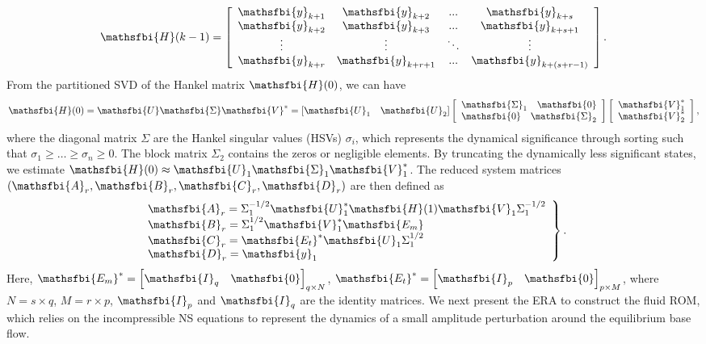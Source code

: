 \documentclass{jfm}
\begin{document}
\begin{equation}
\mathsfbi{H}(k-1) = 
\left[ {\begin{array}{*{20}c}
    \mathsfbi{y}_{k+1}&     \mathsfbi{y}_{k+2}& ...& \mathsfbi{y}_{k+s}        \\    
    \mathsfbi{y}_{k+2}& \mathsfbi{y}_{k+3}& ...& \mathsfbi{y}_{k+s+1}    \\
    \vdots& \vdots& \ddots& \vdots        \\
    \mathsfbi{y}_{k+r}& \mathsfbi{y}_{k+r+1}& ...&\mathsfbi{y}_{k+(s+r-1)}
 \end{array} } \right].
\label{eq:Hankel}
\end{equation}  
From the partitioned SVD of the Hankel matrix $\mathsfbi{H}(0)$, 
we can have
\begin{equation}
\mathsfbi{H}(0) = \mathsfbi{U}\mathsfbi{\Sigma}\mathsfbi{V}^*=
\left[\mathsfbi{U}_1 \quad \mathsfbi{U}_2\right]
\left[{\begin{array}{*{20}c}
   \mathsfbi{\Sigma}_1 \quad \mathsfbi{0} \\
   \mathsfbi{0} \quad \mathsfbi{\Sigma}_2
 \end{array} }
\right]
\left[{\begin{array}{*{20}c}
  \mathsfbi{V}_1^* \\
  \mathsfbi{V}_2^*
 \end{array} }
\right],
\end{equation}
where the diagonal matrix $\Sigma$ are the Hankel singular values (HSVs) $\sigma_{i}$, 
which represents the dynamical significance through sorting 
such that $\sigma_{1} \geq \ldots \geq \sigma_{n} \geq 0$. 
The block matrix $\Sigma_2$ contains the zeros or 
negligible elements. By truncating the dynamically less significant states, we estimate 
$\mathsfbi{H}(0) \approx \mathsfbi{U}_1\mathsfbi{\Sigma}_1\mathsfbi{V}_1^*$.  
The reduced system matrices
$\left(\mathsfbi{A}_{r},\mathsfbi{B}_{r},\mathsfbi{C}_{r},\mathsfbi{D}_{r}\right)$ are then defined as
\begin{equation}
\left. \begin{array}{ll}

\displaystyle \mathsfbi{A}_{r}=\Sigma^{-1/2}_{1}\mathsfbi{U}^{*}_{1}\mathsfbi{H}(1)\mathsfbi{V}_{1}\Sigma^{-1/2}_{1} \\
\displaystyle \mathsfbi{B}_{r}=\Sigma^{1/2}_{1}\mathsfbi{V}^{*}_{1}\mathsfbi{E_m}   \\
\displaystyle \mathsfbi{C}_{r}=\mathsfbi{E_t}^{*}\mathsfbi{U}_{1}\Sigma^{1/2}_{1}   \\    
\displaystyle \mathsfbi{D}_{r}=\mathsfbi{y}_{1}
\end{array}\right\}.
 \label{eq:ERA_ROM_matrices}
\end{equation}  
%
Here, $\mathsfbi{E_m}^*=\left[\mathsfbi{I}_q \quad \mathsfbi{0} \right]_{q\times N}$,
$\mathsfbi{E_t}^{*}=\left[\mathsfbi{I}_p \quad \mathsfbi{0} \right]_{p \times M}$, where
$N =s \times q$, $M =r \times p$, $\mathsfbi{I}_{p}$ and $\mathsfbi{I}_{q}$ are the identity matrices. 
%
We next present the ERA to construct the fluid ROM, which relies 
on the incompressible NS equations to represent the dynamics of a
small amplitude perturbation around the equilibrium base flow. 
\end{document}
